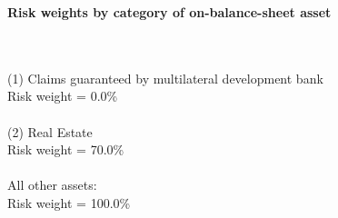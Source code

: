 \documentclass{article}
\begin{document}
\setlength{\parindent}{0em}
\begin{center}{\bf Risk weights by category of on-balance-sheet asset}\end{center}
~\\
~\\

(1) Claims guaranteed by multilateral development bank \\
Risk weight = 0.0\%\\

~\\
(2) Real Estate\\
Risk weight = 70.0\%\\

~\\
All other assets:\\
Risk weight = 100.0\%\\

~\\
\end{document}
